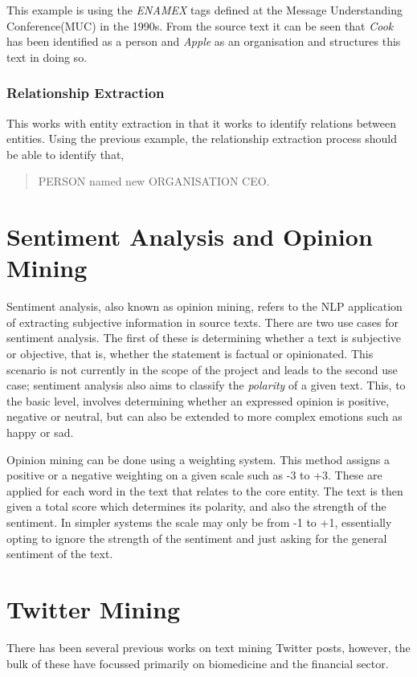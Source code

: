 This example is using the \emph{ENAMEX} tags defined at the Message Understanding Conference(MUC) in the 1990s\cite{grishman96muc}. From the source text it can be seen that \emph{Cook} has been identified as a person and \emph{Apple} as an organisation and structures this text in doing so.

\subsubsection{Relationship Extraction}
This works with entity extraction in that it works to identify relations between entities. Using the previous example, the relationship extraction process should be able to identify that,
\begin{quote}
PERSON named new ORGANISATION CEO.
\end{quote}


\section[Sentiment Analysis]{Sentiment Analysis and Opinion Mining}
Sentiment analysis, also known as opinion mining, refers to the NLP application of extracting subjective information in source texts. There are two use cases for sentiment analysis. The first of these is determining whether a text is subjective or objective, that is, whether the statement is factual or opinionated. This scenario is not currently in the scope of the project and leads to the second use case; sentiment analysis also aims to classify the \emph{polarity} of a given text\cite{Pang+Lee}. This, to the basic level, involves determining whether an expressed opinion is positive, negative or neutral, but can also be extended to more complex emotions such as happy or sad.

Opinion mining can be done using a weighting system. This method assigns a positive or a negative weighting on a given scale such as -3 to +3. These are applied for each word in the text that relates to the core entity. The text is then given a total score which determines its polarity, and also the strength of the sentiment. In simpler systems the scale may only be from -1 to +1, essentially opting to ignore the strength of the sentiment and just asking for the general sentiment of the text.


\section{Twitter Mining}
There has been several previous works on text mining Twitter posts, however, the bulk of these have focussed primarily on biomedicine and the financial sector.

